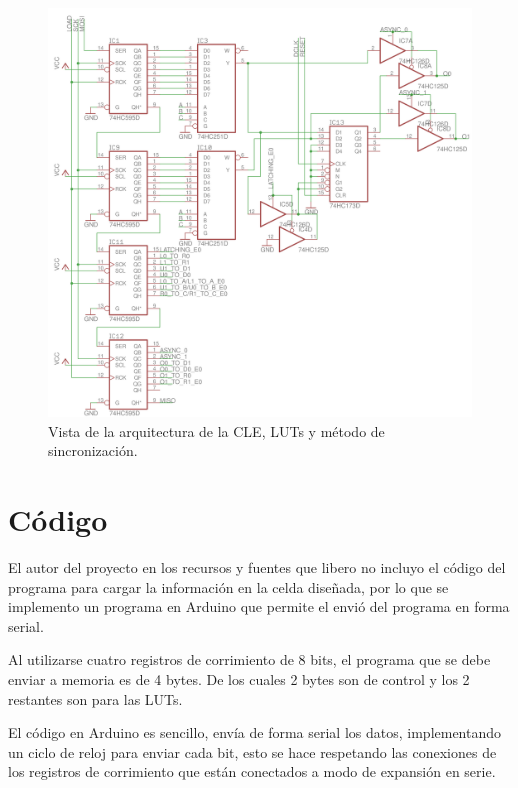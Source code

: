\documentclass[12pt]{article}
\begin{document}
\begin{figure}[H]
  \centering
  \includegraphics[width=\textwidth]{6-clb-lut.png}
  \caption{Vista de la arquitectura de la CLE, LUTs y método de sincronización.}
  \label{fig:8}
\end{figure}

\section{Código}

El autor del proyecto en los recursos y fuentes que libero no incluyo el código del programa para cargar la información en la celda diseñada, por lo que se implemento un programa en Arduino que permite el envió del programa en forma serial. 
 
Al utilizarse cuatro registros de corrimiento de 8 bits, el programa que se debe enviar a memoria es de 4 bytes. De los cuales 2 bytes son de control y los 2 restantes son para las LUTs. 
 
El código en Arduino es sencillo, envía de forma serial los datos, implementando un ciclo de reloj para enviar cada bit, esto se hace respetando las conexiones de los registros de corrimiento que están conectados a modo de expansión en serie.
\end{document}
